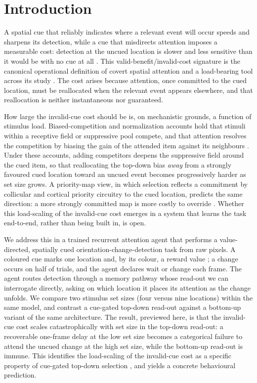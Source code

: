 \section{Introduction}
A spatial cue that reliably indicates where a relevant event will occur speeds and sharpens its detection, while a cue that misdirects attention imposes a measurable cost: detection at the uncued location is slower and less sensitive than it would be with no cue at all \citep{posner1980attention,posner1994visual}. This valid-benefit/invalid-cost signature is the canonical operational definition of covert spatial attention and a load-bearing tool across its study \citep{carrasco2011visual}. The cost arises because attention, once committed to the cued location, must be reallocated when the relevant event appears elsewhere, and that reallocation is neither instantaneous nor guaranteed.

How large the invalid-cue cost should be is, on mechanistic grounds, a function of stimulus load. Biased-competition and normalization accounts hold that stimuli within a receptive field or suppressive pool compete, and that attention resolves the competition by biasing the gain of the attended item against its neighbours \citep{desimone1995neural,reynolds1999competitive,reynolds2000attention,reynolds2009normalization}. Under these accounts, adding competitors deepens the suppressive field around the cued item, so that reallocating the top-down bias \emph{away} from a strongly favoured cued location toward an uncued event becomes progressively harder as set size grows. A priority-map view, in which selection reflects a commitment by collicular and cortical priority circuitry to the cued location, predicts the same direction: a more strongly committed map is more costly to override \citep{krauzlis2018selective,krauzlis2013superior,zenon2012attention}. Whether this load-scaling of the invalid-cue cost emerges in a system that learns the task end-to-end, rather than being built in, is open.

We address this in a trained recurrent attention agent that performs a value-directed, spatially cued orientation-change-detection task from raw pixels. A coloured cue marks one location and, by its colour, a reward value \citep{maunsell2004neuronal,luo2019attention,herman2020attention}; a change occurs on half of trials, and the agent declares wait or change each frame. The agent routes detection through a memory pathway whose read-out we can interrogate directly, asking on which location it places its attention as the change unfolds. We compare two stimulus set sizes (four versus nine locations) within the same model, and contrast a cue-gated top-down read-out against a bottom-up variant of the same architecture. The result, previewed here, is that the invalid-cue cost scales catastrophically with set size in the top-down read-out: a recoverable one-frame delay at the low set size becomes a categorical failure to attend the uncued change at the high set size, while the bottom-up read-out is immune. This identifies the load-scaling of the invalid-cue cost as a specific property of cue-gated top-down selection \citep{sprague2018rescuing}, and yields a concrete behavioural prediction.

